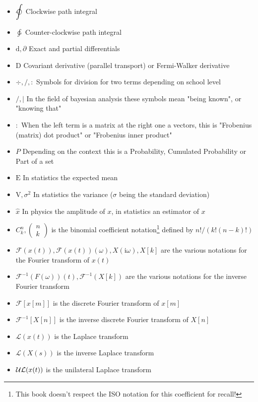 \documentclass[12pt,a4paper,twoside,openright]{report}
\newcounter{def}
\theoremstyle{definition}
\theoremstyle{itexmp}
\numberwithin{equation}{section}
\begin{document}
\begin{itemize}[label={},leftmargin=0.5cm]
	 	\item $\displaystyle\ointclockwise$ Clockwise path integral
	 	\item $\displaystyle\ointctrclockwise$ Counter-clockwise path integral
	 	\item $\mathrm{d},\partial$ Exact and partial differentials
	 	\item $\mathrm{D}$ Covariant derivative (parallel transport) or Fermi-Walker derivative
	 	\item $\div, /, :$ Symbols for division for two terms depending on school level
	 	\item $/, |$ In the field of bayesian analysis these symbols mean "being known", or "knowing that"
	 	\item $:$ When the left term is a matrix at the right one a vectors, this is "Frobenius (matrix) dot product" or "Frobenius inner product"
	 	\item $P$ Depending on the context this is a Probability, Cumulated Probability or Part of a set
	 	\item $\text{E}$ In statistics the expected mean
	 	\item $\text{V},\sigma^2$ In statistics the variance ($\sigma$ being the standard deviation)
	 	\item $\hat{x}$ In physics the amplitude of $x$, in statistics an estimator of $x$
	 	\item $C_k^n,\begin{pmatrix}n\\k\end{pmatrix}$ is the binomial coefficient notation\footnote{This book doesn't respect the ISO notation for this coefficient for recall!} defined by $n!/(k!(n-k)!)$
	 	\item $\mathcal{F}(x(t)), \mathcal{F}(x(t))(\omega), X(\mathrm{i}\omega), X[k]$ are the various notations for the Fourier transform of $x(t)$
	 	\item $\mathcal{F}^{-1}(F(\omega))(t), \mathcal{F}^{-1}(X[k])$ are the various notations for the inverse Fourier transform
	 	\item $\mathcal{F}[x[m]]$ is the discrete Fourier transform of $x[m]$
	 	\item $\mathcal{F}^{-1}[X[n]]$ is the inverse discrete Fourier transform of $X[n]$
	 	\item $\mathcal{L}(x(t))$ is the Laplace transform
	 	\item $\mathcal{L}(X(s))$ is the inverse Laplace transform
	 	\item ${\cal UL}(x(t))$ is the unilateral Laplace transform

\end{itemize}
\end{document}
